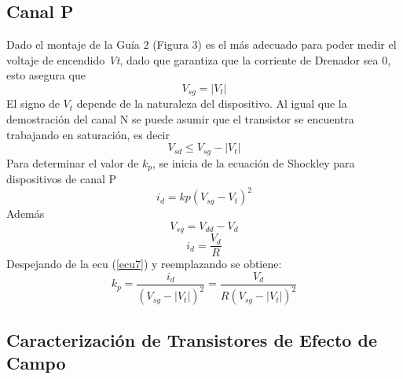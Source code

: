 \documentclass[11pt,graphicx,caption,rotating]{article}
\begin{document}
\subsection{Canal P}
\noindent
Dado el montaje de la Guía $2$ (Figura 3) es el más adecuado para poder medir el voltaje de encendido \textit{Vt}, dado que garantiza que la corriente de Drenador sea $0$, esto asegura que
\begin{equation}
 V_{sg}=|V_t|
\label{ecu5}
\end{equation}
\noindent
El signo de $V_t$ depende de la naturaleza del dispositivo. Al igual que la demostración del canal N se puede asumir que el transistor se encuentra trabajando en saturación, es decir
\begin{equation}
 V_{sd} \leq V_{sg}-|V_t|
\label{ecu6}
\end{equation}
\noindent
Para determinar el valor de $k_p$, se inicia de la ecuación de Shockley para dispositivos de canal P
\begin{equation}
 i_d=kp(V_{sg}-V_t)^2
\label{ecu7}
\end{equation}
Además
\begin{equation}
 V_{sg}=V_{dd}-V_d
\label{ecu8}
\end{equation}
\begin{equation}
 i_d=\frac{V_d}{R}
\label{ecu9}
\end{equation}
\noindent
Despejando de la ecu (\ref{ecu7}) y reemplazando se obtiene:
\begin{equation}
 k_p=\frac{i_d}{(V_{sg}-|V_t|)^{2}}=\frac{V_d}{R(V_{sg}-|V_t|)^{2}}
\label{ecu10}
\end{equation}

\subsection{Caracterización de Transistores de Efecto de Campo}
\end{document}
